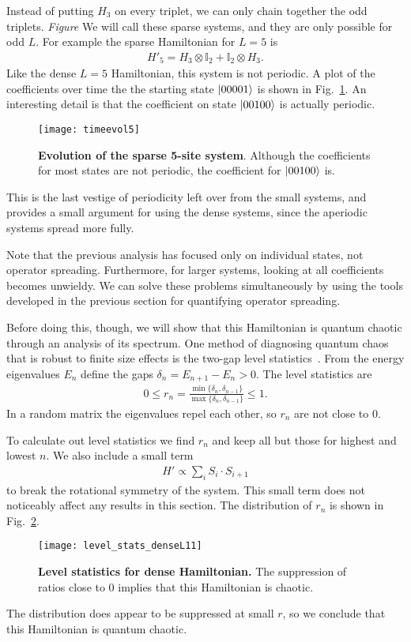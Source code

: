Instead of putting $H_3$ on every triplet, we can only chain together the odd triplets. \emph{Figure} We will call these sparse systems, and they are only possible for odd $L$. For example the sparse Hamiltonian for $L=5$ is
\begin{align}
H'_5 = H_3\otimes\mathbb{I}_2 + \mathbb{I}_2\otimes H_3.
\end{align}
Like the dense $L=5$ Hamiltonian, this system is not periodic. A plot of the coefficients over time the the starting state $\left|00001\right\rangle$ is shown in Fig.~\ref{fig:timeevol5}. An interesting detail is that the coefficient on state $\left|00100\right\rangle$ is actually periodic. 
\begin{figure}
	\centering
	\texttt{[image: timeevol5]}
	\caption{\textbf{Evolution of the sparse 5-site system}. Although the coefficients for most states are not periodic, the coefficient for $\left|00100\right\rangle$ is.}
	\label{fig:timeevol5}
\end{figure} 
This is the last vestige of periodicity left over from the small systems, and provides a small argument for using the dense systems, since the aperiodic systems spread more fully.

Note that the previous analysis has focused only on individual states, not operator spreading. Furthermore, for larger systems, looking at all coefficients becomes unwieldy. We can solve these problems simultaneously by using the tools developed in the previous section for quantifying operator spreading.

Before doing this, though, we will show that this Hamiltonian is quantum chaotic through an analysis of its spectrum. One method of diagnosing quantum chaos that is robust to finite size effects is the two-gap level statistics~\cite{Oganesyan2007}. From the energy eigenvalues $E_n$ define the gaps $\delta_n= E_{n+1}-E_n>0$. The level statistics are
\begin{align}
0\le r_n=\frac{\min\{\delta_n,\delta_{n-1}\}}{\max\{\delta_n,\delta_{n-1}\}}
	\le1.\label{eqn:levelstats}
\end{align}
In a random matrix the eigenvalues repel each other, so $r_n$ are not close to 0.

To calculate out level statistics we find $r_n$ and keep all but those for highest and lowest $n$. We also include a small term  
\begin{align}
H'\propto\sum_i S_i\cdot S_{i+1}
\end{align}
to break the rotational symmetry of the system. This small term does not noticeably affect any results in this section. The distribution of $r_n$ is shown in Fig.~\ref{fig:level_stats_denseL11}.
\begin{figure}
	\centering
	\texttt{[image: level\_stats\_denseL11]}
	\caption{\textbf{Level statistics for dense Hamiltonian.} The suppression of ratios close to 0 implies that this Hamiltonian is chaotic.}
	\label{fig:level_stats_denseL11}
\end{figure}
The distribution does appear to be suppressed at small $r$, so we conclude that this Hamiltonian is quantum chaotic.

